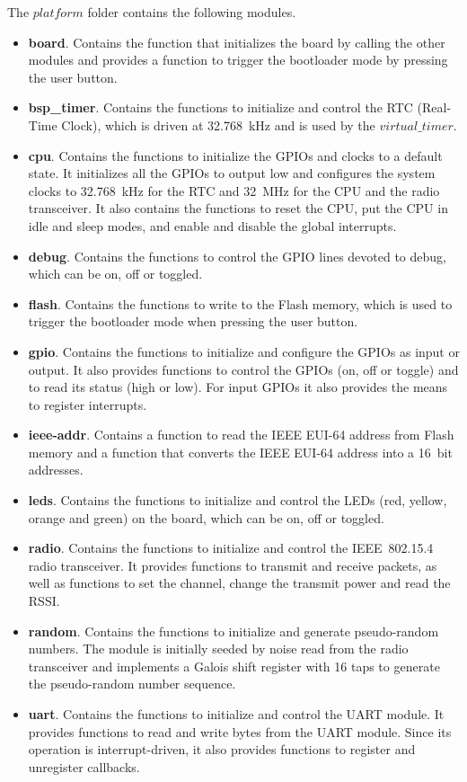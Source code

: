 The $platform$ folder contains the following modules.
\begin{itemize}
\item \textbf{board}. Contains the function that initializes the board by calling the other modules and provides a function to trigger the bootloader mode by pressing the user button.
\item \textbf{bsp\_timer}. Contains the functions to initialize and control the RTC (Real-Time Clock), which is driven at 32.768~kHz and is used by the $virtual\_timer$. 
\item \textbf{cpu}. Contains the functions to initialize the GPIOs and clocks to a default state. It initializes all the GPIOs to output low and configures the system clocks to 32.768~kHz for the RTC and 32~MHz for the CPU and the radio transceiver. It also contains the functions to reset the CPU, put the CPU in idle and sleep modes, and enable and disable the global interrupts.
\item \textbf{debug}. Contains the functions to control the GPIO lines devoted to debug, which can be on, off or toggled.
\item \textbf{flash}. Contains the functions to write to the Flash memory, which is used to trigger the bootloader mode when pressing the user button.
\item \textbf{gpio}. Contains the functions to initialize and configure the GPIOs as input or output. It also provides functions to control the GPIOs (on, off or toggle) and to read its status (high or low). For input GPIOs it also provides the means to register interrupts.
\item \textbf{ieee-addr}. Contains a function to read the IEEE EUI-64 address from Flash memory and a function that converts the IEEE EUI-64 address into a 16~bit addresses.
\item \textbf{leds}. Contains the functions to initialize and control the LEDs (red, yellow, orange and green) on the board, which can be on, off or toggled.
\item \textbf{radio}. Contains the functions to initialize and control the IEEE~802.15.4 radio transceiver. It provides functions to transmit and receive packets, as well as functions to set the channel, change the transmit power and read the RSSI.
\item \textbf{random}. Contains the functions to initialize and generate pseudo-random numbers. The module is initially seeded by noise read from the radio transceiver and implements a Galois shift register with 16 taps to generate the pseudo-random number sequence.
\item \textbf{uart}. Contains the functions to initialize and control the UART module. It provides functions to read and write bytes from the UART module. Since its operation is interrupt-driven, it also provides functions to register and unregister callbacks.
\end{itemize}

